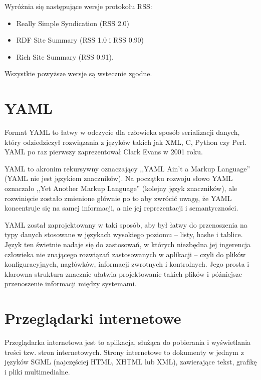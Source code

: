 \documentclass[a4paper,12pt,oneside]{report}
\begin{document}
Wyróżnia się następujące wersje protokołu RSS:
\begin{itemize}
  \item Really Simple Syndication (RSS 2.0)
  \item RDF Site Summary (RSS 1.0 i RSS 0.90)
  \item Rich Site Summary (RSS 0.91).
\end{itemize}

Wszystkie powyższe wersje są wstecznie zgodne.

\section{YAML}
\label{sec:yaml}
Format YAML to łatwy w odczycie dla człowieka sposób serializacji danych, który odziedziczył rozwiązania z języków takich jak XML, C, Python czy Perl. YAML po raz pierwszy zaprezentował Clark Evans w 2001 roku.

YAML to akronim rekursywny oznaczający ,,YAML Ain't a Markup Language'' (YAML nie jest językiem znaczników). Na początku rozwoju słowo YAML oznaczało ,,Yet Another Markup Language'' (kolejny język znaczników), ale rozwinięcie zostało zmienione głównie po to aby zwrócić uwagę, że YAML koncentruje się na samej informacji, a nie jej reprezentacji i semantyczności.

YAML został zaprojektowany w taki sposób, aby był łatwy do przenoszenia na typy danych stosowane w językach wysokiego poziomu -- listy, hashe i tablice. Język ten świetnie nadaje się do zastosowań, w których niezbędna jej ingerencja człowieka nie znającego rozwiązań zastosowanych w aplikacji -- czyli do plików konfiguracyjnych, nagłówków, informacji zwrotnych i kontrolnych. Jego prosta i klarowna struktura znacznie ułatwia projektowanie takich plików i późniejsze przenoszenie informacji między systemami.

\section{Przeglądarki internetowe}
\label{sec:przegladarki}

Przeglądarka internetowa jest to aplikacja, służąca do pobierania i wyświetlania treści tzw. stron internetowych. Strony internetowe to dokumenty w jednym z języków SGML (najczęściej HTML, XHTML lub XML), zawierające tekst, grafikę i pliki multimedialne.
\end{document}

